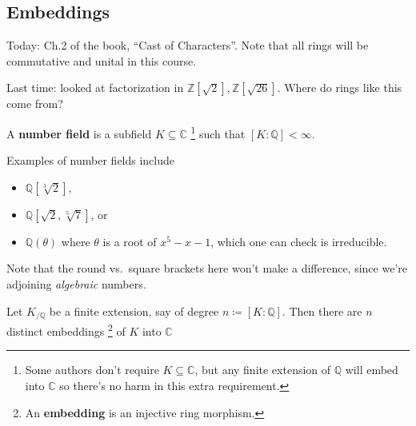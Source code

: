 \hypertarget{embeddings}{%
\subsection{Embeddings}\label{embeddings}}

\begin{remark}

Today: Ch.2 of the book, ``Cast of Characters''. Note that all rings
will be commutative and unital in this course.

Last time: looked at factorization in
\({\mathbb{Z}}[\sqrt 2], {\mathbb{Z}}[\sqrt{26}]\). Where do rings like
this come from?

\end{remark}

\begin{definition}

A \textbf{number field} is a subfield \(K \subseteq {\mathbb{C}}\)
\footnote{Some authors don't require \(K \subseteq {\mathbb{C}}\), but
  any finite extension of \({\mathbb{Q}}\) will embed into
  \({\mathbb{C}}\) so there's no harm in this extra requirement.} such
that \([K: {\mathbb{Q}}] < \infty\).

\end{definition}

\begin{example}

Examples of number fields include

\begin{itemize}
\tightlist
\item
  \({\mathbb{Q}}[\sqrt[3]{2}]\),
\item
  \({\mathbb{Q}}[\sqrt 2, \sqrt[5]{7}]\), or
\item
  \({\mathbb{Q}}(\theta)\) where \(\theta\) is a root of
  \(x^5 - x - 1\), which one can check is irreducible.
\end{itemize}

Note that the round vs.~square brackets here won't make a difference,
since we're adjoining \emph{algebraic} numbers.

\end{example}

\begin{proposition}

Let \(K_{/{\mathbb{Q}}}\) be a finite extension, say of degree
\(n\coloneqq[K: {\mathbb{Q}}]\). Then there are \(n\) distinct
embeddings \footnote{An \textbf{embedding} is an injective ring
  morphism.} of \(K\) into \({\mathbb{C}}\)

\end{proposition}

